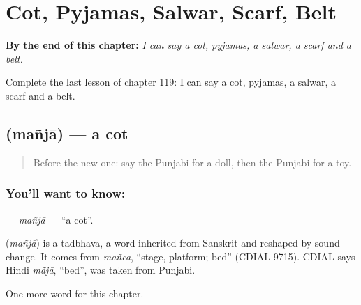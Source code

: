 
\chapter{Cot, Pyjamas, Salwar, Scarf, Belt}
\label{ch:pa-cot-pyjamas-salwar-scarf-belt}

\begin{chapteropening}
\textbf{By the end of this chapter:} \emph{I can say a cot, pyjamas, a salwar, a scarf and a belt.}

Complete the last lesson of chapter 119: I can say a cot, pyjamas, a salwar, a scarf and a belt.
\end{chapteropening}

\section[\texorpdfstring{\pa{ਮੰਜਾ} (mañjā)}{ਮੰਜਾ (mañjā)}]{ (mañjā) — a cot}

\label{lesson:PA-C119-manja}



\begin{quote}
Before the new one: say the Punjabi for a doll, then the Punjabi for a toy.
\end{quote}

\subsection*{You'll want to know: }
\textbf{} — \emph{mañjā} — \textquotedblleft{}a cot\textquotedblright{}.

\begin{cousinweb}
\textbf{} (\emph{mañjā}) is a tadbhava, a word inherited from Sanskrit and reshaped by sound change. It comes from \emph{mañca}, \textquotedblleft{}stage, platform; bed\textquotedblright{} (CDIAL 9715). CDIAL says Hindi \emph{mãjā}, \textquotedblleft{}bed\textquotedblright{}, was taken from Punjabi.
\end{cousinweb}

\begin{grammarlens}[title={What you've built}]
One more word for this chapter.
\end{grammarlens}

